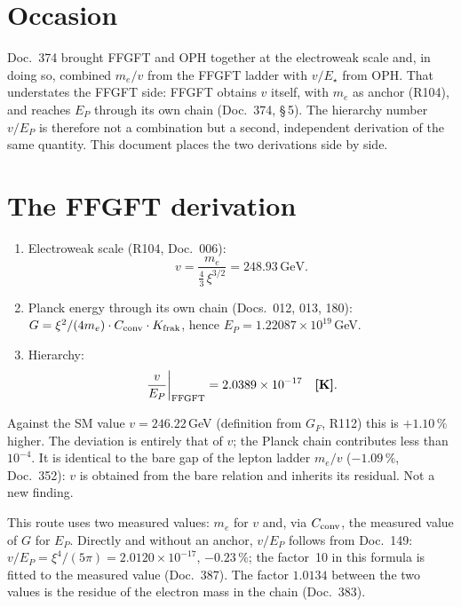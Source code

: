 \section{Occasion}

Doc.~374 brought FFGFT and OPH together at the electroweak scale and, in doing
so, combined $m_e/v$ from the FFGFT ladder with $v/E_\star$ from OPH. That
understates the FFGFT side: FFGFT obtains $v$ itself, with $m_e$ as anchor (R104), and reaches $E_P$
through its own chain (Doc.~374, §\,5). The hierarchy number $v/E_P$ is
therefore not a combination but a second, independent derivation of the same
quantity. This document places the two derivations side by side.

\section{The FFGFT derivation}

\begin{enumerate}\itemsep2pt
\item Electroweak scale (R104, Doc.~006):
  \begin{equation}
    v=\frac{m_e}{\tfrac43\,\xi^{3/2}}=248.93\,\mathrm{GeV}.
  \end{equation}
\item Planck energy through its own chain (Docs.~012, 013, 180):
  $G=\xi^2/(4m_e)\cdot C_{\rm conv}\cdot K_{\rm frak}$, hence
  $E_P=1.22087\times10^{19}$\,GeV.
\item Hierarchy:
  \begin{equation}
    \left.\frac{v}{E_P}\right|_{\rm FFGFT}=2.0389\times10^{-17}\quad\textbf{[K]} .
  \end{equation}
\end{enumerate}

Against the SM value $v=246.22$\,GeV (definition from $G_F$, R112) this is
$+1.10\,\%$ higher. The deviation is entirely that of $v$; the Planck chain
contributes less than $10^{-4}$. It is identical to the bare gap of the
lepton ladder $m_e/v$ ($-1.09\,\%$, Doc.~352): $v$ is obtained from the bare
relation and inherits its residual. Not a new finding.

This route uses two measured values: $m_e$ for $v$ and, via $C_{\rm conv}$,
the measured value of $G$ for $E_P$. Directly and without an anchor, $v/E_P$
follows from Doc.~149: $v/E_P = \xi^4/(5\pi) = 2.0120\times10^{-17}$,
$-0.23\,\%$; the factor~10 in this formula is fitted to the measured value
(Doc.~387). The factor $1.0134$ between the two values is the residue of the
electron mass in the chain (Doc.~383).

